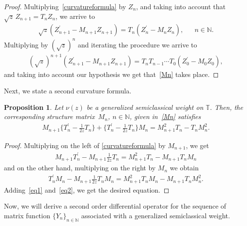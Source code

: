 \documentclass[12pt]{amsart}
\newtheorem{proposition}{Proposition}[section]
\begin{document}
\begin{proof}
Multiplying~\eqref{curvatureformula} by \( Z_n \), and taking into account that
\( \sqrt{z} \, Z_{n+1}=T_nZ_n \), we arrive to
\begin{align*}
\sqrt{z} \left( Z^\prime_{n+1} - M_{n+1} Z_{n+1} \right) =T_n \left( Z^\prime_{n} - M_{n} Z_{n} \right) ,
&&
n \in \mathbb N.
\end{align*}
Multiplying by \( (\sqrt{z})^n \) and iterating the procedure we arrive to
\begin{align*}
(\sqrt{z})^{n+1} \left( Z^\prime_{n+1} - M_{n+1} Z_{n+1} \right)
 = T_n T_{n-1} \cdots T_0 \left( Z^\prime_{0} - M_{0} Z_{0} \right) ,
\end{align*}
and taking into account our hypothesis we get that~\eqref{Mn} takes place.
\end{proof}



Next, we state a second curvature formula.

\begin{proposition}\label{propeqfund2} 
Let \( \nu(z) \) be a
generalized
semiclassical weight on \( \mathbb T \).
Then, the corresponding structure matrix~\( M_n \), \( n\in\mathbb{N} \), given in~\eqref{Mn}
 satisfies
\begin{align*}
{M}_{n+1}\Big\{T_n^\prime -\frac{1}{2z}T_n\Big\}+\Big\{T_n^\prime-\frac{1}{2z}T_n\Big\}{M}_{n}={M}_{n+1}^2T_n-T_n{M}_n^2.
\end{align*}
\end{proposition}


\begin{proof}
Multiplying on the left of \eqref{curvatureformula} by \( {M}_{n+1} \), we get
\begin{align}\label{eq1}
{M}_{n+1} T_n^\prime-{M}_{n+1}\frac{1}{2z}T_n={M}_{n+1}^2T_n-{M}_{n+1}T_n{M}_n
\end{align}
and on the other hand, multiplying on the right by \( {M}_n \) we obtain
\begin{align}\label{eq2}
T_n^\prime {M}_n-{M}_{n+1}\frac{1}{2z}T_n {M}_n={M}_{n+1}^2T_n {M}_n- {M}_{n+1}T_n {M}_n^2.
\end{align}
Adding~\eqref{eq1} and~\eqref{eq2}, we get the desired equation.
\end{proof}


Now, we will derive a second order differential operator for the sequence of matrix function \( \{Y_n \}_{n \in \mathbb N} \) associated with a generalized semiclassical weight.
\end{document}

